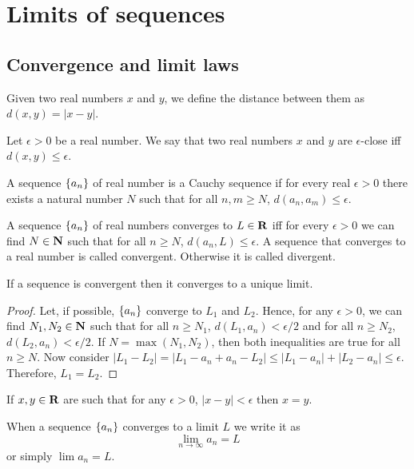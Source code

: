 \chapter{Limits of sequences}\label{c5}
\section{Convergence and limit laws}\label{c5s1}
\begin{defn}\label{c5s1d1}
Given two real numbers $x$ and $y$, we define the distance between them as
$d(x, y) = |x - y|$.
\end{defn}
\begin{defn}\label{c5s1d2}
Let $\epsilon > 0$ be a real number. We say that two real numbers $x$ and $y$
are $\epsilon$-close iff $d(x, y) \le \epsilon$.
\end{defn}
\begin{defn}\label{c5s1d3}
A sequence $\{a_n\}$ of real number is a Cauchy sequence if for every
real $\epsilon > 0$ there exists a natural number $N$ such that for all
$n, m \ge N$, $d(a_n, a_m) \le \epsilon$.
\end{defn}
\begin{defn}\label{c5s1d4}
A sequence $\{a_n\}$ of real numbers converges to $L \in \mathbf{R}$ iff for
every $\epsilon > 0$ we can find $N \in \mathbf{N}$ such that for all $n \ge N$,
$d(a_n, L) \le \epsilon$. A sequence that converges to a real number is 
called convergent. Otherwise it is called divergent.
\end{defn}

\begin{prop}\label{c5s1p1}
If a sequence is convergent then it converges to a unique limit.
\end{prop}
\begin{proof}
Let, if possible, $\{a_n\}$ converge to $L_1$ and $L_2$. Hence, for any 
$\epsilon > 0$, we can find $N_1, N_2 \in \mathbf{N}$ such that for all $n \ge 
N_1$, $d(L_1, a_n) < \epsilon/2$ and for all $n \ge N_2$, $d(L_2, a_n) <
\epsilon/2$. If $N = \max(N_1, N_2)$, then both inequalities are true for
all $n \ge N$. Now consider $|L_1 - L_2| = |L_1 - a_n + a_n - L_2| \le
|L_1 - a_n| + |L_2 - a_n| \le \epsilon$. Therefore, $L_1 = L_2$.
\end{proof}
\begin{rem}
If $x, y \in \mathbf{R}$ are such that for any $\epsilon > 0$, $|x - y| < \epsilon$
then $x = y$.
\end{rem}

When a sequence $\{a_n\}$ converges to a limit $L$ we write it as
\[
\lim_{n \rightarrow \infty} a_n = L
\]
or simply $\lim a_n = L$.

